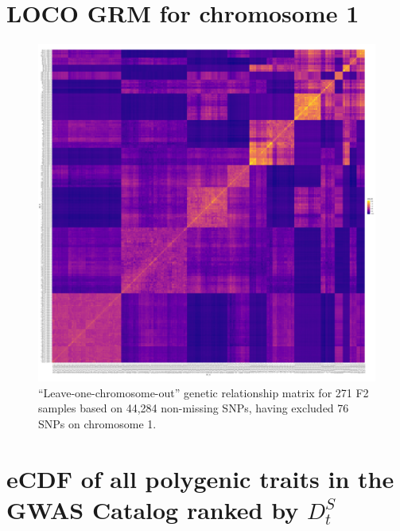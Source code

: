 \documentclass[
]{book}
\begin{document}
\hypertarget{loco-grm-for-chromosome-1}{%
\chapter{LOCO GRM for chromosome 1}\label{loco-grm-for-chromosome-1}}



\begin{figure}
\includegraphics[width=1\linewidth]{figs/mikk_behaviour/grm_loco_man_chr1} \caption{``Leave-one-chromosome-out'' genetic relationship matrix for 271 F2 samples based on 44,284 non-missing SNPs, having excluded 76 SNPs on chromosome 1.}\label{fig:loco-grm-chr1}
\end{figure}

\hypertarget{ecdf-of-all-polygenic-traits-in-the-gwas-catalog-ranked-by-d_ts}{%
\chapter{\texorpdfstring{eCDF of all polygenic traits in the GWAS Catalog ranked by \({D_t^S}\)}{eCDF of all polygenic traits in the GWAS Catalog ranked by \{D\_t\^{}S\}}}\label{ecdf-of-all-polygenic-traits-in-the-gwas-catalog-ranked-by-d_ts}}
\end{document}
